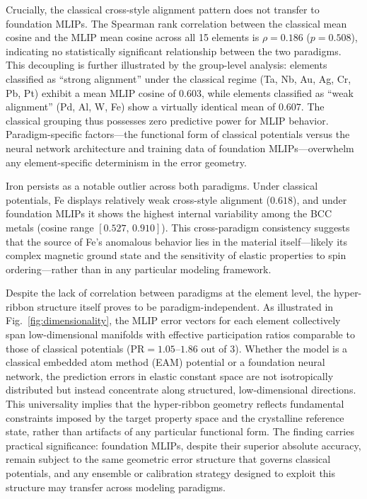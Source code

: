\documentclass[twocolumn,9pt]{extarticle}
\begin{document}
Crucially, the classical cross-style alignment pattern does not transfer to foundation MLIPs. The Spearman rank correlation between the classical mean cosine and the MLIP mean cosine across all 15 elements is $\rho = 0.186$ ($p = 0.508$), indicating no statistically significant relationship between the two paradigms. This decoupling is further illustrated by the group-level analysis: elements classified as ``strong alignment'' under the classical regime (Ta, Nb, Au, Ag, Cr, Pb, Pt) exhibit a mean MLIP cosine of $0.603$, while elements classified as ``weak alignment'' (Pd, Al, W, Fe) show a virtually identical mean of $0.607$. The classical grouping thus possesses zero predictive power for MLIP behavior. Paradigm-specific factors---the functional form of classical potentials versus the neural network architecture and training data of foundation MLIPs---overwhelm any element-specific determinism in the error geometry.

Iron persists as a notable outlier across both paradigms. Under classical potentials, Fe displays relatively weak cross-style alignment ($0.618$), and under foundation MLIPs it shows the highest internal variability among the BCC metals (cosine range $[0.527,\,0.910]$). This cross-paradigm consistency suggests that the source of Fe's anomalous behavior lies in the material itself---likely its complex magnetic ground state and the sensitivity of elastic properties to spin ordering---rather than in any particular modeling framework.

Despite the lack of correlation between paradigms at the element level, the hyper-ribbon structure itself proves to be paradigm-independent. As illustrated in Fig.~\ref{fig:dimensionality}, the MLIP error vectors for each element collectively span low-dimensional manifolds with effective participation ratios comparable to those of classical potentials ($\text{PR} = 1.05$--$1.86$ out of 3). Whether the model is a classical embedded atom method (EAM) potential or a foundation neural network, the prediction errors in elastic constant space are not isotropically distributed but instead concentrate along structured, low-dimensional directions. This universality implies that the hyper-ribbon geometry reflects fundamental constraints imposed by the target property space and the crystalline reference state, rather than artifacts of any particular functional form. The finding carries practical significance: foundation MLIPs, despite their superior absolute accuracy, remain subject to the same geometric error structure that governs classical potentials, and any ensemble or calibration strategy designed to exploit this structure may transfer across modeling paradigms.
\end{document}
